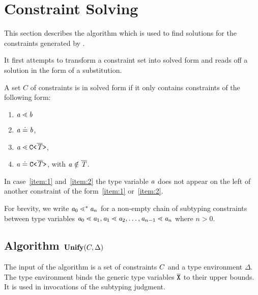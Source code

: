 \section{Constraint Solving}
\label{sec:unify}

This section describes the \unify{} algorithm
which is used to find solutions for the constraints generated by \fjtype{}.

It first attempts to transform a constraint set into solved form and
reads off a solution in the form of a substitution.

\begin{definition}\label{def:solved-form}
  A set $C$ of constraints is in solved form if it only contains
  constraints of  the following form:
  \begin{enumerate}
  \item $\mathit{ a } \lessdot \mathit{ b }$ %
  \item $\mathit{ a } \doteq \mathit{ b }$,
  \item\label{item:1} $\mathit{ a } \lessdot \mathtt{C \texttt{<} \overline{\tt \mathit{T}} \texttt{>} }$, 
  \item\label{item:2} $\mathit{ a } \doteq \mathtt{C \texttt{<} \overline{\tt \mathit{T}} \texttt{>} }$, with $\mathit{ a } \notin \overline{\tt \mathit{T}}$.
  \end{enumerate}
  In case~\ref{item:1} and~\ref{item:2} the type variable $\mathit{ a }$ does not appear on the left of another constraint of the
  form~\ref{item:1} or~\ref{item:2}.
\end{definition}  

For brevity, we write $\mathit{ a }_0 \lessdot^* \mathit{ a }_n$ for a non-empty chain of subtyping constraints between type variables $\mathit{ a }_0 \lessdot
\mathit{ a }_1, \mathit{ a }_1 \lessdot \mathit{ a }_2, \dots, \mathit{ a }_{n-1} \lessdot \mathit{ a }_n$ where $n>0$.

\subsection{{Algorithm $\textbf{Unify}{} (C, \Delta)$}}


The input of the algorithm is a set of constraints $C$ and a
type environment $\Delta$. The type environment binds the generic type
variables $\overline{\tt X}$ to their upper bounds. It is used in invocations of
the subtyping judgment.


